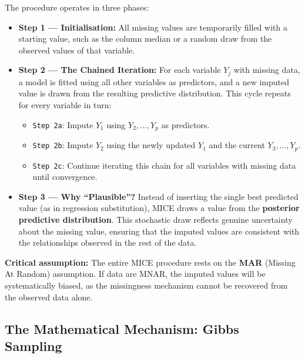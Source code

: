 \documentclass[11pt]{article}
\theoremstyle{smallexample}
\begin{document}
The procedure operates in three phases:

 \begin{itemize}
  \item \textbf{Step 1 — Initialisation:} All missing values are temporarily filled
    with a starting value, such as the column median or a random draw from the
    observed values of that variable.

  \vspace{0.2cm}
  \item \textbf{Step 2 — The Chained Iteration:} For each variable $Y_j$ with
    missing data, a model is fitted using all other variables as predictors,
    and a new imputed value is drawn from the resulting predictive distribution.
    This cycle repeats for every variable in turn:
   \begin{itemize}
    \item \texttt{Step 2a}: Impute $Y_1$ using $Y_2, \ldots, Y_p$ as predictors.
    \vspace{0.2cm}
    \item \texttt{Step 2b}: Impute $Y_2$ using the newly updated $Y_1$ and the
      current $Y_3, \ldots, Y_p$.
    \vspace{0.2cm}
    \item \texttt{Step 2c}: Continue iterating this chain for all variables with
      missing data until convergence.
   \end{itemize}

  \vspace{0.2cm}
  \item \textbf{Step 3 — Why ``Plausible''?} Instead of inserting the single best
    predicted value (as in regression substitution), MICE draws a value from the
    \textbf{posterior predictive distribution}. This stochastic draw reflects
    genuine uncertainty about the missing value, ensuring that the imputed values
    are consistent with the relationships observed in the rest of the data.
 \end{itemize}

\noindent
\textbf{Critical assumption:} The entire MICE procedure rests on the \textbf{MAR}
(Missing At Random) assumption. If data are MNAR, the imputed values will be
systematically biased, as the missingness mechanism cannot be recovered from the
observed data alone.

\subsection{The Mathematical Mechanism: Gibbs Sampling}
\end{document}
